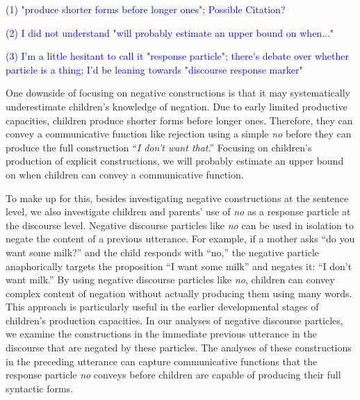 \documentclass[
  english,
  man,floatsintext]{apa6}
\begin{document}
\textcolor{blue}{(1) "produce shorter forms before longer ones"; Possible Citation?}

\textcolor{blue}{(2) I did not understand "will probably estimate an upper bound on when..."}

\textcolor{blue}{(3) I'm a little hesitant to call it "response particle"; there's debate over whether particle is a thing; I'd be leaning towards "discourse response marker"}

One downside of focusing on negative constructions is that it may systematically underestimate children's knowledge of negation. Due to early limited productive capacities, children produce shorter forms before longer ones. Therefore, they can convey a communicative function like rejection using a simple \emph{no} before they can produce the full construction ``\emph{I don't want that}.'' Focusing on children's production of explicit constructions, we will probably estimate an upper bound on when children can convey a communicative function.

To make up for this, besides investigating negative constructions at the sentence level, we also investigate children and parents' use of \emph{no} as a response particle at the discourse level. Negative discourse particles like \emph{no} can be used in isolation to negate the content of a previous utterance. For example, if a mother asks ``do you want some milk?'' and the child responds with ``no,'' the negative particle anaphorically targets the proposition ``I want some milk'' and negates it: ``I don't want milk.'' By using negative discourse particles like \emph{no}, children can convey complex content of negation without actually producing them using many words. This approach is particularly useful in the earlier developmental stages of children's production capacities. In our analyses of negative discourse particles, we examine the constructions in the immediate previous utterance in the discourse that are negated by these particles. The analyses of these constructions in the preceding utterance can capture communicative functions that the response particle \emph{no} conveys before children are capable of producing their full syntactic forms.
\end{document}
